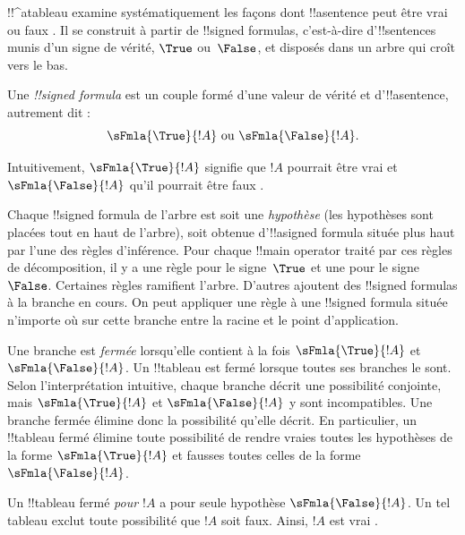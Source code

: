 \documentclass[../../../include/open-logic-section]{subfiles}
\begin{document}
      {}
      {}


!!^a{tableau} examine systématiquement les façons dont
!!a{sentence} peut être vrai ou faux
. Il se construit
à partir de !!{signed formula}s, c'est-à-dire d'!!{sentence}s munis
d'un signe de vérité, $\True$ ou~$\False$, et disposés dans un arbre
qui croît vers le bas.

\begin{defn}
  Une \emph{!!{signed formula}} est un couple formé d'une valeur de
  vérité et d'!!a{sentence}, autrement dit :
  \[
  \sFmla{\True}{!A} \text{ ou } \sFmla{\False}{!A}.
  \]
\end{defn}

Intuitivement, $\sFmla{\True}{!A}$ signifie que $!A$ pourrait
être vrai et $\sFmla{\False}{!A}$ qu'il pourrait être faux
.

Chaque !!{signed formula} de l'arbre est soit une \emph{hypothèse}
(les hypothèses sont placées tout en haut de l'arbre), soit obtenue
d'!!a{signed formula} située plus haut par l'une des règles d'inférence.
Pour chaque !!{main operator} traité par ces règles de
décomposition, il y a une règle pour le signe~$\True$ et une pour
le signe~$\False$. Certaines règles ramifient l'arbre. D'autres
ajoutent des !!{signed formula}s à la branche en cours.
On peut appliquer une règle à une !!{signed formula} située
n'importe où sur cette branche entre la racine et le point
d'application.

Une branche est \emph{fermée} lorsqu'elle contient à la fois
$\sFmla{\True}{!A}$ et $\sFmla{\False}{!A}$. Un !!{tableau} est fermé
lorsque toutes ses branches le sont. Selon l'interprétation intuitive,
chaque branche décrit une possibilité conjointe, mais
$\sFmla{\True}{!A}$ et $\sFmla{\False}{!A}$ y sont incompatibles.
Une branche fermée élimine donc la possibilité qu'elle
décrit. En particulier, un !!{tableau} fermé élimine toute possibilité
de rendre vraies toutes les hypothèses de la forme
$\sFmla{\True}{!A}$ et fausses toutes celles de la forme
$\sFmla{\False}{!A}$.

Un !!{tableau} fermé \emph{pour $!A$} a pour seule hypothèse
$\sFmla{\False}{!A}$. Un tel tableau exclut toute possibilité
que $!A$ soit faux. Ainsi, $!A$ est vrai
.
\end{document}
